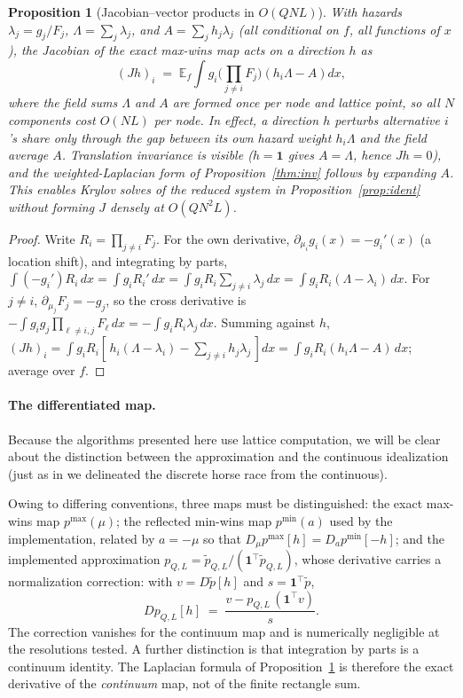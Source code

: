 \documentclass[12pt]{article}
\newtheorem{proposition}{Proposition}
\theoremstyle{remark}
\newcommand{\E}{\mathbb{E}}
\begin{document}
\begin{proposition}[Jacobian--vector products in $O(QNL)$]\label{prop:jvp}
With hazards $\lambda_j = g_j / F_j$, $\Lambda = \sum_j \lambda_j$, and
$A = \sum_j h_j \lambda_j$ (all conditional on $f$, all functions of $x$),
the Jacobian of the exact max-wins map acts on a direction $h$ as
\[
(Jh)_i \;=\; \E_f \int g_i \Big(\prod_{j \ne i} F_j\Big)
\left( h_i \Lambda - A \right) dx ,
\]
where the field sums $\Lambda$ and $A$ are formed once per node and lattice
point, so all $N$ components cost $O(NL)$ per node. In effect, a direction
$h$ perturbs alternative $i$'s share only through the gap between its own
hazard weight $h_i \Lambda$ and the field average $A$. Translation
invariance is visible ($h = \mathbf{1}$ gives $A = \Lambda$, hence $Jh =
0$), and the weighted-Laplacian form of Proposition~\ref{thm:inv} follows by
expanding $A$.
This enables Krylov solves of the reduced system in
Proposition~\ref{prop:ident} without forming $J$ densely at $O(QN^2L)$.
\end{proposition}
\begin{proof}
Write $R_i = \prod_{j \ne i} F_j$. For the own derivative,
$\partial_{\mu_i} g_i(x) = -g_i'(x)$ (a location shift), and integrating by
parts, $\int (-g_i') R_i\,dx = \int g_i R_i' \,dx = \int g_i R_i
\sum_{j \ne i} \lambda_j\,dx = \int g_i R_i (\Lambda -
\lambda_i)\,dx$. For $j \ne i$, $\partial_{\mu_j} F_j = -g_j$, so the
cross derivative is $-\int g_i g_j \prod_{\ell \ne i,j} F_\ell\,dx =
-\int g_i R_i \lambda_j\,dx$. Summing against $h$,
$(Jh)_i = \int g_i R_i [\,h_i(\Lambda - \lambda_i) - \sum_{j \ne i}
h_j \lambda_j\,]dx = \int g_i R_i (h_i \Lambda - A)\,dx$; average over
$f$.
\end{proof}

\paragraph{The differentiated map.} 
Because the algorithms presented here use lattice computation, we will be clear about
the distinction between the approximation and the continuous idealization (just as in \citet{cotton2021}
we delineated the discrete horse race from the continuous). 

Owing to differing conventions, three maps must be
distinguished: the exact max-wins map $p^{\max}(\mu)$; the reflected
min-wins map $p^{\min}(a)$ used by the implementation, related by $a = -\mu$
so that $D_\mu p^{\max}[h] = D_a p^{\min}[-h]$; and the implemented
approximation $p_{Q,L} = \tilde p_{Q,L} / (\mathbf{1}^\top \tilde
p_{Q,L})$, whose derivative carries a normalization correction: with $v =
D\tilde p[h]$ and $s = \mathbf{1}^\top \tilde p$,
\[
D p_{Q,L}[h] \;=\; \frac{v - p_{Q,L}\, (\mathbf{1}^\top v)}{s}.
\]
The correction vanishes for the continuum map and is numerically
negligible at the resolutions tested. A further distinction is that integration by parts is a continuum
identity. The Laplacian formula of Proposition~\ref{prop:jvp} is
therefore the exact derivative of the \emph{continuum} map, not of the
finite rectangle sum.
\end{document}
